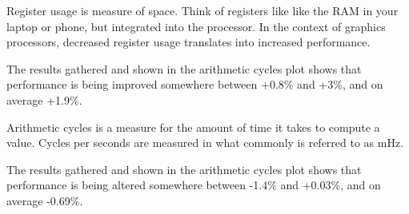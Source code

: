 \documentclass[12pt,a4paper,onecolumn,openright]{report}
\begin{document}
\begin{multicols}{2}
Register usage is measure of space. Think of registers like like the RAM in your laptop or phone, but integrated into the processor. In the context of graphics processors, decreased register usage translates into increased performance.


The results gathered and shown in the arithmetic cycles plot shows that performance is being improved somewhere between +0.8\% and +3\%, and on average +1.9\%.



\begin{figure}[H]
\label{plot:a_cycles}
\end{figure}

Arithmetic cycles is a measure for the amount of time it takes to compute a value. Cycles per seconds are measured in what commonly is referred to as mHz.

The results gathered and shown in the arithmetic cycles plot shows that performance is being altered somewhere between -1.4\% and +0.03\%, and on average -0.69\%.



\end{multicols}
\end{document}
